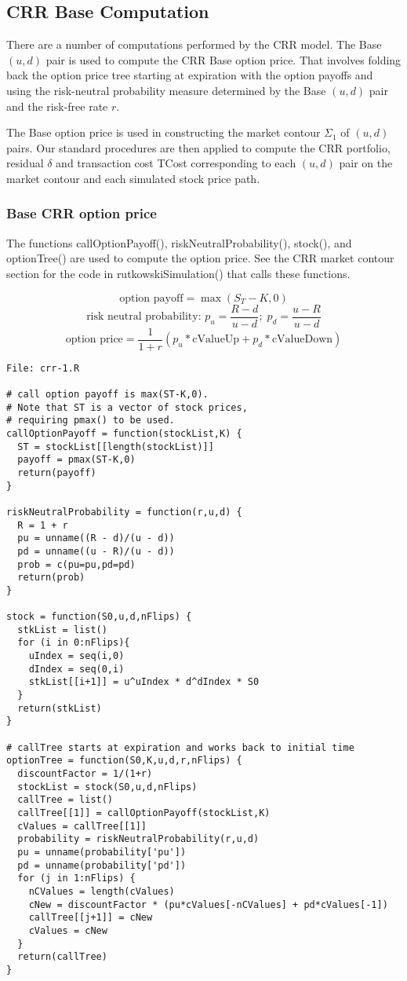 \documentclass[10pt]{article}
\begin{document}
\subsection*{CRR Base Computation}

There are a number of computations performed by the CRR model. The Base $(u,d)$ pair
is used to compute the CRR Base option price. That involves folding back the option
price tree starting at expiration with the option payoffs and using the risk-neutral
probability measure determined by the Base $(u,d)$ pair and the risk-free rate $r$.

The Base option price is used in constructing the market contour
$\Sigma_1$ of $(u,d)$ pairs. Our standard procedures are then applied to compute
the CRR portfolio, residual $\delta$ and transaction cost TCost corresponding to each
$(u,d)$ pair on the market contour and each simulated stock price path.

\subsubsection*{Base CRR option price}

The functions callOptionPayoff(), riskNeutralProbability(), stock(),
and optionTree() are used to compute the option price. See the CRR market contour section
for the code in rutkowskiSimulation() that calls these functions.

\[
\text{option payoff} = \max({S_T-K,0})
\]
\[
\text{risk neutral probability: } p_u = \frac{R-d}{u-d};\; p_d = \frac{u-R}{u-d}
\]
\[
\text{option price} = \frac{1}{1+r}(p_u * \text{cValueUp} + p_d * \text{cValueDown})
\]

\begin{verbatim}
File: crr-1.R

# call option payoff is max(ST-K,0).
# Note that ST is a vector of stock prices,
# requiring pmax() to be used.
callOptionPayoff = function(stockList,K) {
  ST = stockList[[length(stockList)]]
  payoff = pmax(ST-K,0)
  return(payoff)
}

riskNeutralProbability = function(r,u,d) {
  R = 1 + r
  pu = unname((R - d)/(u - d))
  pd = unname((u - R)/(u - d))
  prob = c(pu=pu,pd=pd)
  return(prob)
}

stock = function(S0,u,d,nFlips) {
  stkList = list()
  for (i in 0:nFlips){
    uIndex = seq(i,0)
    dIndex = seq(0,i)
    stkList[[i+1]] = u^uIndex * d^dIndex * S0
  }
  return(stkList)
}

# callTree starts at expiration and works back to initial time
optionTree = function(S0,K,u,d,r,nFlips) {
  discountFactor = 1/(1+r)
  stockList = stock(S0,u,d,nFlips)
  callTree = list()
  callTree[[1]] = callOptionPayoff(stockList,K)
  cValues = callTree[[1]]
  probability = riskNeutralProbability(r,u,d)
  pu = unname(probability['pu'])
  pd = unname(probability['pd'])
  for (j in 1:nFlips) {
    nCValues = length(cValues)
    cNew = discountFactor * (pu*cValues[-nCValues] + pd*cValues[-1])
    callTree[[j+1]] = cNew
    cValues = cNew
  }
  return(callTree)
}
\end{verbatim}
\end{document}
